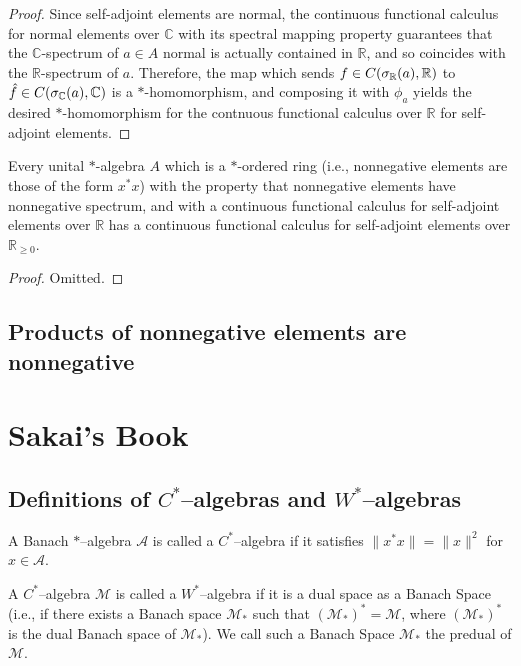 \begin{proof}
  \leanok
  Since self-adjoint elements are normal, the continuous functional calculus for normal elements over $\mathbb{C}$ with its spectral mapping property guarantees that the $\mathbb{C}$-spectrum of $a \in A$ normal is actually contained in $\mathbb{R}$, and so coincides with the $\mathbb{R}$-spectrum of $a$.
  Therefore, the map which sends $f \in C(\spectrum[\mathbb{R}]{a}, \mathbb{R})$ to $\hat f \in C(\spectrum[\mathbb{C}]{a}, \mathbb{C})$ is a $*$-homomorphism, and composing it with $\phi_a$ yields the desired $*$-homomorphism for the contnuous functional calculus over $\mathbb{R}$ for self-adjoint elements.
\end{proof}

\begin{theorem}
  \label{thm:cfc_real_to_nnreal}
  \mathlibok
  Every unital $*$-algebra $A$ which is a $*$-ordered ring (i.e., nonnegative elements are those of the form $x^* x$) with the property that nonnegative elements have nonnegative spectrum, and with a continuous functional calculus for self-adjoint elements over $\mathbb{R}$ has a continuous functional calculus for self-adjoint elements over $\mathbb{R}_{\ge 0}$.
\end{theorem}

\begin{proof}
  \leanok
  Omitted.
\end{proof}


\section{Products of nonnegative elements are nonnegative}

\chapter{Sakai's Book}

\section{Definitions of $C^{*}$--algebras and $W^{*}$--algebras}

\begin{definition}
  \label{def:CStarAlgebra}
  \mathlibok
  A Banach $*$--algebra $\mathcal{A}$ is called a $C^{*}$--algebra if it satisfies $\|x^{*}x\|=\|x\|^2$ for $x\in \mathcal{A}$.
\end{definition}

\begin{definition}
  \label{def:WStarAlgebra}
  \mathlibok
  A $C^{*}$--algebra $\mathcal{M}$ is called a $W^{*}$--algebra if it is a dual space as a Banach Space (i.e., if there exists 
  a Banach space $\mathcal{M}_{*}$ such that $(\mathcal{M}_{*})^{*}=\mathcal{M}$, where $(\mathcal{M}_{*})^{*}$ is the dual Banach
  space of $\mathcal{M_{*}}$). We call such a Banach Space $\mathcal{M_{*}}$ the predual of $\mathcal{M}$.
\end{definition}